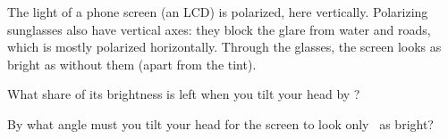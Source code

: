 The light of a phone screen (an LCD) is polarized, here vertically. Polarizing sunglasses also have vertical axes: they block the glare from water and roads, which is mostly polarized horizontally. Through the glasses, the screen looks as bright as without them (apart from the tint).

\begin{abcliste}
\abc What share of its brightness is left when you tilt your head by \alO?

\abc By what angle must you tilt your head for the screen to look only \srO\ as bright?
\end{abcliste}
